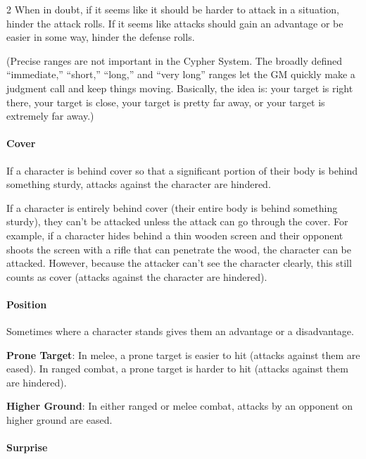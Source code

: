 \begin{multicols}{2}
When in doubt, if it seems like it should be harder to attack in a situation, hinder the attack rolls. If it seems like attacks should gain an advantage or be easier in some way, hinder the defense rolls.

(Precise ranges are not important in the Cypher System. The broadly defined “immediate,” “short,” “long,” and “very long” ranges let the GM quickly make a judgment call and keep things moving. Basically, the idea is: your target is right there, your target is close, your target is pretty far away, or your target is extremely far away.)

\paragraph{Cover}

If a character is behind cover so that a significant portion of their body is behind something sturdy, attacks against the character are hindered.

If a character is entirely behind cover (their entire body is behind something sturdy), they can’t be attacked unless the attack can go through the cover. For example, if a character hides behind a thin wooden screen and their opponent shoots the screen with a rifle that can penetrate the wood, the character can be attacked. However, because the attacker can’t see the character clearly, this still counts as cover (attacks against the character are hindered).

\paragraph{Position}

Sometimes where a character stands gives them an advantage or a disadvantage.

\textbf{Prone Target}: In melee, a prone target is easier to hit (attacks against them are eased). In ranged combat, a prone target is harder to hit (attacks against them are hindered).

\textbf{Higher Ground}: In either ranged or melee combat, attacks by an opponent on higher ground are eased.

\paragraph{Surprise}


\end{multicols}
